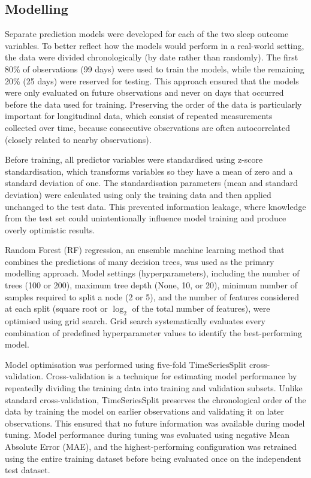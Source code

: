 \documentclass[fleqn,10pt]{wlscirep}
\begin{document}
\subsection*{Modelling}

Separate prediction models were developed for each of the two sleep outcome variables. To better reflect how the models would perform in a real-world setting, the data were divided chronologically (by date rather than randomly). The first 80\% of observations (99 days) were used to train the models, while the remaining 20\% (25 days) were reserved for testing. This approach ensured that the models were only evaluated on future observations and never on days that occurred before the data used for training. Preserving the order of the data is particularly important for longitudinal data, which consist of repeated measurements collected over time, because consecutive observations are often autocorrelated (closely related to nearby observations).

Before training, all predictor variables were standardised using z-score standardisation, which transforms variables so they have a mean of zero and a standard deviation of one. The standardisation parameters (mean and standard deviation) were calculated using only the training data and then applied unchanged to the test data. This prevented information leakage, where knowledge from the test set could unintentionally influence model training and produce overly optimistic results.

Random Forest (RF) regression, an ensemble machine learning method that combines the predictions of many decision trees, was used as the primary modelling approach. Model settings (hyperparameters), including the number of trees (100 or 200), maximum tree depth (None, 10, or 20), minimum number of samples required to split a node (2 or 5), and the number of features considered at each split (square root or $\log_2$ of the total number of features), were optimised using grid search. Grid search systematically evaluates every combination of predefined hyperparameter values to identify the best-performing model.

Model optimisation was performed using five-fold TimeSeriesSplit cross-validation. Cross-validation is a technique for estimating model performance by repeatedly dividing the training data into training and validation subsets. Unlike standard cross-validation, TimeSeriesSplit preserves the chronological order of the data by training the model on earlier observations and validating it on later observations. This ensured that no future information was available during model tuning. Model performance during tuning was evaluated using negative Mean Absolute Error (MAE), and the highest-performing configuration was retrained using the entire training dataset before being evaluated once on the independent test dataset.
\end{document}

